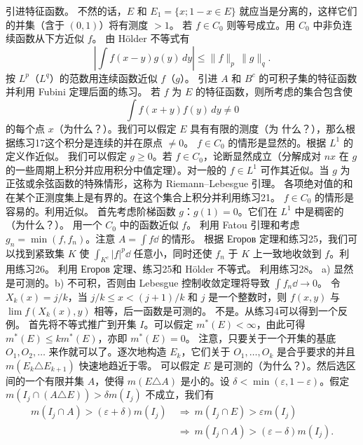 \begin{enumerate}[label=\textbf{\arabic*.},itemsep=.8em]
 引进特征函数。
 不然的话，$E$ 和 $E_1=\{x;1-x\in E\}$ 就应当是分离的，这样它们的并集（含于 $(0,1)$）将有测度 $>1$。
 若 $f\in C_0$ 则等号成立。用 $C_0$ 中非负连续函数从下方近似 $f$。
 由 Hölder 不等式有
\[\left|\int f(x-y)g(y)\,dy\right|\le\|f\|_p\,\|g\|_q.\]
按 $L^p$（$L^q$）的范数用连续函数近似 $f$（$g$）。
 引进 $A$ 和 $B^c$ 的可积子集的特征函数并利用 Fubini 定理后面的练习。
 若 $f$ 为 $E$ 的特征函数，则所考虑的集合包含使
\[\int f(x+y)f(y)\,dy\ne0\]
的每个点 $x$（为什么？）。我们可以假定 $E$ 具有有限的测度（为
什么？），那么根据练习17这个积分是连续的并在原点 $\ne0$。
 $f\in C_0$ 的情形是显然的。根据 $L^1$ 的定义作近似。
 我们可以假定 $g\ge0$。若 $f\in C_0$，论断显然成立（分解成对 $nx$ 在 $g$ 的一些周期上积分并应用积分中值定理）。对一般的 $f\in L^1$ 可作其近似。当 $g$ 为正弦或余弦函数的特殊情形，这称为 Riemann--Lebesgue 引理。
 各项绝对值的和在某个正测度集上是有界的。在这个集合上积分并利用练习21。
 $f\in C_0$ 的情形是容易的。利用近似。
 首先考虑阶梯函数 $g$：$g(1)=0$。它们在 $L^1$ 中是稠密的（为什么？）。
 用一个 $C_0$ 中的函数近似 $f$。
 利用 Fatou 引理和考虑 $g_n=\min(f,f_n)$。注意 $A=\int f\dd$ 的情形。
 根据 Егоров 定理和练习25，我们可以找到紧致集 $K$ 使 $\int_{K^c}|f|^p\dd$ 任意小，同时还使 $f_n$ 于 $K$ 上一致地收敛到 $f$。利用练习26。
 利用 Егоров 定理、练习25和 Hölder 不等式。
 利用练习28。
 a) 显然是可测的。b) 不可积，否则由 Lebesgue 控制收敛定理将导致 $\int f_n\dd\to0$。
 令 $X_k(x)=j/k$，当 $j/k\le x<(j+1)/k$ 和 $j$ 是一个整数时，则 $f(x,y)$ 与 $\lim f(X_k(x),y)$ 相等，后一函数是可测的。
 不是。从练习4可以得到一个反例。
 首先将不等式推广到开集 $I$。可以假定 $m^*(E)<\infty$，由此可得 $m^*(E)\le k m^*(E)$，亦即 $m^*(E)=0$。
 注意，只要关于一个开集的基底 $O_1,O_2,\ldots$ 来作就可以了。逐次地构造 $E_k$，它们关于 $O_1,\ldots,O_k$ 是合乎要求的并且
$m(E_k\triangle E_{k+1})$ 快速地趋近于零。
 可以假定 $E$ 是可测的（为什么？）。然后选区间的一个有限并集 $A$，使得 $m(E\triangle A)$ 是小的。设 $\delta<\min(\varepsilon,1-\varepsilon)$。假定 $m(I_j\cap(A\triangle E))>\delta m(I_j)$ 不成立，我们有
\begin{align*}
m(I_j\cap A)>(\varepsilon+\delta)m(I_j)&\ \Rightarrow\ m(I_j\cap E)>\varepsilon m(I_j)\\
&\ \Rightarrow\ m(I_j\cap A)>(\varepsilon-\delta)m(I_j).
\end{align*}

\end{enumerate}
